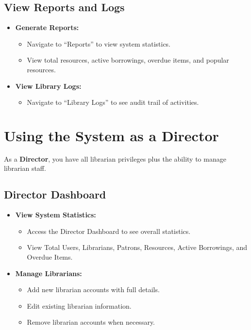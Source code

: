 \documentclass[11pt,a4paper]{article}
\begin{document}
\subsection{View Reports and Logs}

\begin{itemize}
    \item \textbf{Generate Reports:}
    \begin{itemize}
        \item Navigate to ``Reports'' to view system statistics.
        \item View total resources, active borrowings, overdue items, and popular resources.
    \end{itemize}

    \item \textbf{View Library Logs:}
    \begin{itemize}
        \item Navigate to ``Library Logs'' to see audit trail of activities.
    \end{itemize}
\end{itemize}

\section{Using the System as a Director}

As a \textbf{Director}, you have all librarian privileges plus the ability to manage librarian staff.

\subsection{Director Dashboard}

\begin{itemize}
    \item \textbf{View System Statistics:}
    \begin{itemize}
        \item Access the Director Dashboard to see overall statistics.
        \item View Total Users, Librarians, Patrons, Resources, Active Borrowings, and Overdue Items.
    \end{itemize}

    \item \textbf{Manage Librarians:}
    \begin{itemize}
        \item Add new librarian accounts with full details.
        \item Edit existing librarian information.
        \item Remove librarian accounts when necessary.
    \end{itemize}
\end{itemize}
\end{document}
